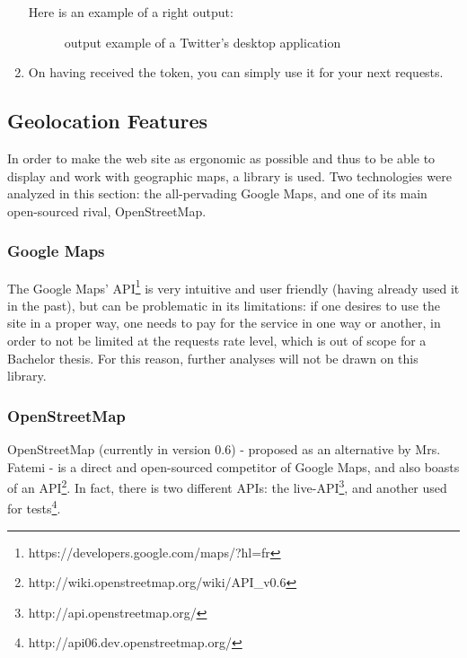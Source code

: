 \documentclass[a4paper,11pt]{report}
\begin{document}
\begin{enumerate}
	Here is an example of a right output:
	\begin{figure}[H]
	\vspace{-5pt}
	\begin{center}
	\vspace{-5pt}
	\caption{output example of a Twitter's desktop application}
	\end{center}
	\end{figure}
	\vspace{-20pt}
	
	\item On having received the token, you can simply use it for your next requests.
\end{enumerate}
\bigskip

\subsection{Geolocation Features}
In order to make the web site as ergonomic as possible and thus to be able to display and work with geographic maps, a library is used. Two technologies were analyzed in this section: the all-pervading Google Maps, and one of its main open-sourced rival, OpenStreetMap.

\subsubsection{Google Maps}
The Google Maps' API\footnote{https://developers.google.com/maps/?hl=fr} is very intuitive and user friendly (having already used it in the past), but can be problematic in its limitations: if one desires to use the site in a proper way, one needs to pay for the service in one way or another, in order to not be limited at the requests rate level, which is out of scope for a Bachelor thesis. For this reason, further analyses will not be drawn on this library.

\subsubsection{OpenStreetMap}
OpenStreetMap (currently in version 0.6) - proposed as an alternative by Mrs. Fatemi - is a direct and open-sourced competitor of Google Maps, and also boasts of an API\footnote{http://wiki.openstreetmap.org/wiki/API\_v0.6}.
In fact, there is two different APIs: the live-API\footnote{http://api.openstreetmap.org/}, and another used for tests\footnote{http://api06.dev.openstreetmap.org/}.\\
\end{document}
